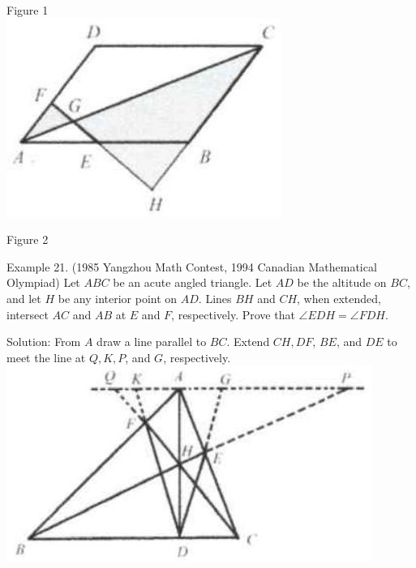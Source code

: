 \documentclass[10pt]{article}
\begin{document}
Figure 1\\
\includegraphics[max width=\textwidth, center]{2025_04_17_97bc1f7e44d93c271a88g-124(2)}

Figure 2

Example 21. (1985 Yangzhou Math Contest, 1994 Canadian Mathematical Olympiad) Let \(A B C\) be an acute angled triangle. Let \(A D\) be the altitude on \(B C\), and let \(H\) be any interior point on \(A D\). Lines \(B H\) and \(C H\), when extended, intersect \(A C\) and \(A B\) at \(E\) and \(F\), respectively. Prove that \(\angle E D H=\angle F D H\).

Solution:
From \(A\) draw a line parallel to \(B C\). Extend \(C H, D F\), \(B E\), and \(D E\) to meet the line at \(Q, K, P\), and \(G\), respectively.\\
\includegraphics[max width=\textwidth, center]{2025_04_17_97bc1f7e44d93c271a88g-124(1)}
\end{document}
